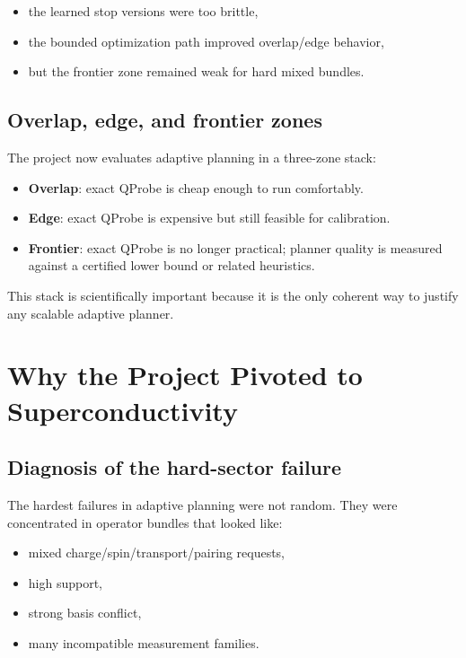 \documentclass[11pt]{article}
\begin{document}
\begin{itemize}
\item the learned stop versions were too brittle,
\item the bounded optimization path improved overlap/edge behavior,
\item but the frontier zone remained weak for hard mixed bundles.
\end{itemize}

\subsection{Overlap, edge, and frontier zones}

The project now evaluates adaptive planning in a three-zone stack:

\begin{itemize}
\item \textbf{Overlap}: exact QProbe is cheap enough to run comfortably.
\item \textbf{Edge}: exact QProbe is expensive but still feasible for calibration.
\item \textbf{Frontier}: exact QProbe is no longer practical; planner quality is measured against a certified lower bound or related heuristics.
\end{itemize}

This stack is scientifically important because it is the only coherent way to justify any scalable adaptive planner.

\section{Why the Project Pivoted to Superconductivity}

\subsection{Diagnosis of the hard-sector failure}

The hardest failures in adaptive planning were not random. They were concentrated in operator bundles that looked like:

\begin{itemize}
\item mixed charge/spin/transport/pairing requests,
\item high support,
\item strong basis conflict,
\item many incompatible measurement families.
\end{itemize}
\end{document}
